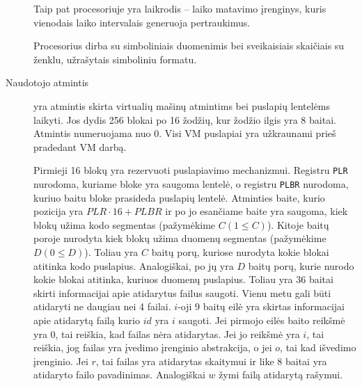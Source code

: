 \begin{description}
    Taip pat procesoriuje yra laikrodis – laiko matavimo įrenginys, kuris
    vienodais laiko intervalais generuoja pertraukimus. 

    Procesorius dirba su simboliniais duomenimis bei sveikaisiais 
    skaičiais su ženklu, užrašytais simboliniu formatu.
  \item[Naudotojo atmintis] yra atmintis skirta virtualių mašinų atmintims 
    bei puslapių lentelėms laikyti. Jos dydis 256 blokai po 16 žodžių, kur
    žodžio ilgis yra 8 baitai. Atmintis numeruojama nuo 0. Visi VM 
    puslapiai yra užkraunami prieš pradedant VM darbą.

    Pirmieji 16 blokų yra rezervuoti puslapiavimo mechanizmui. Registru
    \verb|PLR| nurodoma, kuriame bloke yra saugoma lentelė, o registru
    \verb|PLBR| nurodoma, kuriuo baitu bloke prasideda puslapių lentelė.
    Atminties baite, kurio pozicija yra $PLR \cdot 16 + PLBR$ ir po jo 
    esančiame baite yra saugoma, kiek blokų užima kodo segmentas 
    (pažymėkime $C (1 \leq C)$). Kitoje baitų poroje nurodyta kiek blokų 
    užima duomenų segmentas (pažymėkime $D (0 \leq D)$). Toliau yra 
    $C$ baitų porų, kuriose nurodyta kokie blokai atitinka kodo puslapius.
    Analogiškai, po jų yra $D$ baitų porų, kurie nurodo kokie blokai 
    atitinka, kuriuos duomenų puslapius. Toliau yra 36 baitai skirti
    informacijai apie atidarytus failus saugoti. Vienu metu gali
    būti atidaryti ne daugiau nei 4 failai. $i$-oji 9 baitų eilė yra skirtas
    informacijai apie atidarytą failą kurio $id$ yra $i$ saugoti. Jei
    pirmojo eilės baito reikšmė yra $0$, tai reiškia, kad failas nėra
    atidarytas. Jei jo reikšmė yra $i$, tai reiškia, jog failas yra
    įvedimo įrenginio abstrakcija, o jei $o$, tai kad išvedimo įrenginio.
    Jei $r$, tai failas yra atidarytas skaitymui ir like 8 baitai yra
    atidaryto failo pavadinimas. Analogiškai $w$ žymi failą atidarytą
    rašymui.


\end{description}
